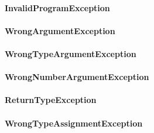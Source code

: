 \documentclass[parskip=full]{scrartcl}
\begin{document}
\paragraph{InvalidProgramException}
\paragraph{WrongArgumentException}
\paragraph{WrongTypeArgumentException}
\paragraph{WrongNumberArgumentException}
\paragraph{ReturnTypeException}
\paragraph{WrongTypeAssignmentException}
\end{document}
